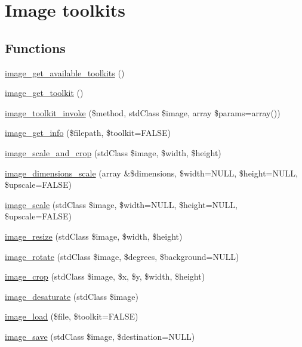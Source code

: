 \hypertarget{group__image}{
\section{Image toolkits}
\label{group__image}
}
\subsection*{Functions}
\begin{DoxyCompactItemize}
\item 
\hyperlink{group__image_ga190b9b90f931916a5766ed11c29b9326}{image\_\-get\_\-available\_\-toolkits} ()
\item 
\hyperlink{group__image_ga08b3ce83f3526f248c1e08b4ee249a3a}{image\_\-get\_\-toolkit} ()
\item 
\hyperlink{group__image_ga49dd01a9f7b8037f15b99e098f068cb7}{image\_\-toolkit\_\-invoke} (\$method, stdClass \$image, array \$params=array())
\item 
\hyperlink{group__image_ga7b2603b2b9d073cc4db9a6200aa9c2a4}{image\_\-get\_\-info} (\$filepath, \$toolkit=FALSE)
\item 
\hyperlink{group__image_ga8d6850eecb498cf1683808eb66b74465}{image\_\-scale\_\-and\_\-crop} (stdClass \$image, \$width, \$height)
\item 
\hyperlink{group__image_gaf85b92c29d7c70328ccc3401357eaee9}{image\_\-dimensions\_\-scale} (array \&\$dimensions, \$width=NULL, \$height=NULL, \$upscale=FALSE)
\item 
\hyperlink{group__image_ga2eac147bb70d14d9439d6b0d54023ce3}{image\_\-scale} (stdClass \$image, \$width=NULL, \$height=NULL, \$upscale=FALSE)
\item 
\hyperlink{group__image_ga991594ed9388b740bc98a162b6bbc449}{image\_\-resize} (stdClass \$image, \$width, \$height)
\item 
\hyperlink{group__image_gaccf6671cd3ed866c6463ef6ae6436dc3}{image\_\-rotate} (stdClass \$image, \$degrees, \$background=NULL)
\item 
\hyperlink{group__image_gaaf7d382a8ec190f746478848ed309fe7}{image\_\-crop} (stdClass \$image, \$x, \$y, \$width, \$height)
\item 
\hyperlink{group__image_gadfcfdfcf1521b26ec790fc017c151aff}{image\_\-desaturate} (stdClass \$image)
\item 
\hyperlink{group__image_ga96098e5b039dc3906a656fa889a04776}{image\_\-load} (\$file, \$toolkit=FALSE)
\item 
\hyperlink{group__image_ga134df2e4d035378b52e866618c164f3b}{image\_\-save} (stdClass \$image, \$destination=NULL)

\end{DoxyCompactItemize}
